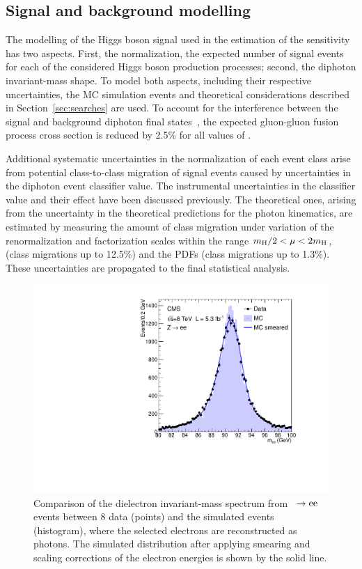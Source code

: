 \documentclass[12pt,twoside,a4paper,cmspaper,final,collab]{cms-tdr}
\begin{document}
\begin{table}[htbp]
\begin{center}
\begin{tabular}
\hline
\end{tabular}

\label{tab:ClassFracs}
\end{center}
\end{table}

\subsection{Signal and background modelling}
\label{sec:hgg_smodeling}



The modelling of the Higgs boson signal used in the estimation of the sensitivity has
two aspects. First, the normalization, \ie the
expected number of signal events for each of the considered Higgs boson production processes;
second, the diphoton invariant-mass shape. To model both aspects, including their respective
uncertainties, the MC simulation events and theoretical considerations described
in Section~\ref{sec:searches} are used. To account for the interference between the signal and
background diphoton final states~\cite{interference}, the expected
gluon-gluon fusion process cross section is reduced by 2.5\% for all
values of \mH.

Additional systematic uncertainties in the normalization of each event class
arise from potential class-to-class migration of signal events caused by
uncertainties in the diphoton event classifier value.
The instrumental uncertainties in the classifier value and their effect have been discussed previously.
The theoretical ones, arising from the uncertainty
in the theoretical predictions for the photon kinematics,
are estimated by measuring the amount of class migration under variation of the renormalization and factorization scales
within the range $m_{\mathrm{H}}/2 < \mu < 2m_{\mathrm{H}}$,
(class migrations up to 12.5\%) and the PDFs (class migrations up to 1.3\%).
These uncertainties are propagated to the final statistical analysis.

\begin{figure}[htbp]
  \begin{center}
    \includegraphics[width=0.55\linewidth]{figures/hgg_resolution.pdf}
    \caption{
      Comparison of the dielectron invariant-mass spectrum from \cPZ~$\to \mathrm{e}\mathrm{e}$ events between 8\TeV
      data (points) and the simulated events (histogram), where the selected electrons are reconstructed as photons.
      The simulated distribution after applying smearing and scaling corrections of the electron energies
      is shown by the solid line.
    }
    \label{fig:hgg_resolution}
  \end{center}
\end{figure}
\end{document}
